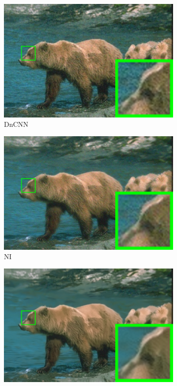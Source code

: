 \begin{figure}
\begin{subfigure}[t]{0.24\textwidth}
        \includegraphics[width=1\textwidth]{images/twsc/nc/resize_br_DnCNN_bears.png}
\caption{DnCNN}
    \end{subfigure}
\hfill
    \begin{subfigure}[t]{0.24\textwidth}
        \centering
        \includegraphics[width=1\textwidth]{images/twsc/nc/resize_br_NI_bears.png}
\caption{NI}
    \end{subfigure}
\hfill
    \begin{subfigure}[t]{0.24\textwidth}
        \centering
        \includegraphics[width=1\textwidth]{images/twsc/nc/resize_br_NC_bears.png}

\end{subfigure}
\end{figure}
